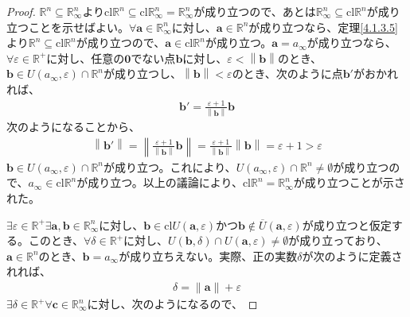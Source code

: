 \documentclass[dvipdfmx]{jsarticle}
\begin{document}
\begin{proof}
$\mathbb{R}^{n} \subseteq \mathbb{R}_{\infty}^{n}$より$\mathrm{cl}\mathbb{R}^{n} \subseteq \mathrm{cl}\mathbb{R}_{\infty}^{n} = \mathbb{R}_{\infty}^{n}$が成り立つので、あとは$\mathbb{R}_{\infty}^{n} \subseteq \mathrm{cl}\mathbb{R}^{n}$が成り立つことを示せばよい。$\forall\mathbf{a} \in \mathbb{R}_{\infty}^{n}$に対し、$\mathbf{a} \in \mathbb{R}^{n}$が成り立つなら、定理\ref{4.1.3.5}より$\mathbb{R}^{n} \subseteq \mathrm{cl}\mathbb{R}^{n}$が成り立つので、$\mathbf{a} \in \mathrm{cl}\mathbb{R}^{n}$が成り立つ。$\mathbf{a} = a_{\infty}$が成り立つなら、$\forall\varepsilon \in \mathbb{R}^{+}$に対し、任意の$\mathbf{0}$でない点$\mathbf{b}$に対し、$\varepsilon < \left\| \mathbf{b} \right\|$のとき、$\mathbf{b} \in U\left( a_{\infty},\varepsilon \right) \cap \mathbb{R}^{n}$が成り立つし、$\left\| \mathbf{b} \right\| < \varepsilon$のとき、次のように点$\mathbf{b}'$がおかれれば、
\begin{align*}
\mathbf{b}' = \frac{\varepsilon + 1}{\left\| \mathbf{b} \right\|}\mathbf{b}
\end{align*}
次のようになることから、
\begin{align*}
\left\| \mathbf{b}' \right\| = \left\| \frac{\varepsilon + 1}{\left\| \mathbf{b} \right\|}\mathbf{b} \right\| = \frac{\varepsilon + 1}{\left\| \mathbf{b} \right\|}\left\| \mathbf{b} \right\| = \varepsilon + 1 > \varepsilon
\end{align*}
$\mathbf{b} \in U\left( a_{\infty},\varepsilon \right) \cap \mathbb{R}^{n}$が成り立つ。これにより、$U\left( a_{\infty},\varepsilon \right) \cap \mathbb{R}^{n} \neq \emptyset$が成り立つので、$a_{\infty} \in \mathrm{cl}\mathbb{R}^{n}$が成り立つ。以上の議論により、$\mathrm{cl}\mathbb{R}^{n} = \mathbb{R}_{\infty}^{n}$が成り立つことが示された。\par
$\exists\varepsilon \in \mathbb{R}^{+}\exists\mathbf{a},\mathbf{b} \in \mathbb{R}_{\infty}^{n}$に対し、$\mathbf{b} \in \mathrm{cl}{U\left( \mathbf{a},\varepsilon \right)}$かつ$\mathbf{b} \notin \overline{U}\left( \mathbf{a},\varepsilon \right)$が成り立つと仮定する。このとき、$\forall\delta \in \mathbb{R}^{+}$に対し、$U\left( \mathbf{b},\delta \right) \cap U\left( \mathbf{a},\varepsilon \right) \neq \emptyset$が成り立っており、$\mathbf{a} \in \mathbb{R}^{n}$のとき、$\mathbf{b} = a_{\infty}$が成り立ちえない。実際、正の実数$\delta$が次のように定義されれば、
\begin{align*}
\delta = \left\| \mathbf{a} \right\| + \varepsilon
\end{align*}
$\exists\delta \in \mathbb{R}^{+}\forall\mathbf{c} \in \mathbb{R}_{\infty}^{n}$に対し、次のようになるので、

\end{proof}
\end{document}
